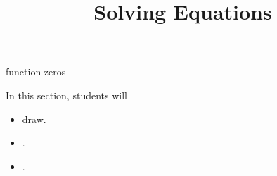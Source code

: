 \documentclass{ximera}
\title{Solving Equations}
\begin{document}
\begin{abstract}
%
\end{abstract}
\maketitle




function zeros


























\begin{sectionOutcomes}
In this section, students will 

\begin{itemize}
\item draw.
\item .
\item .
\end{itemize}
\end{sectionOutcomes}
\end{document}
